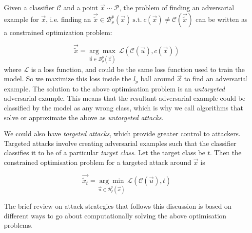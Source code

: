 \documentclass{ociamthesis}
\begin{document}
Given a classifier $\mathcal{C}$ and a point $\vec{x} \sim \mathcal{P}$, the
problem of finding an adversarial example for $\vec{x}$, i.e. finding an
$\vec{\tilde{x}} \in \mathcal{B}_\rho^p(\vec{x})~\text{s.t.}~c(\vec{x}) \neq
\mathcal{C}(\vec{\tilde{x}})$ can be written as a constrained optimization
problem:

\begin{equation*}
    \vec{\tilde{x}} = \underset{\vec{u} \in \mathcal{B}_\rho^p(\vec{x})}
    {\arg\max}~\mathcal{L}(\mathcal{C}(\vec{u}), c(\vec{x}))
\end{equation*}
where $\mathcal{L}$ is a loss function, and could be the same loss function used
to train the model. So we maximize this loss inside the $l_p$ ball around
$\vec{x}$ to find an adversarial example. The solution to the above optimisation
problem is an \emph{untargeted} adversarial example. This means that the
resultant adversarial example could be classified by the model as any wrong
class, which is why we call algorithms that solve or approximate the above as
\emph{untargeted attacks}.

We could also have \emph{targeted attacks}, which provide greater control to
attackers. Targeted attacks involve creating adversarial examples such that the
classifier classifies it to be of a particular \emph{target class}. Let the
target class be $t$. Then the constrained optimisation problem for a targeted
attack around $\vec{x}$ is

\begin{equation*}
    \vec{\tilde{x}_t} = \underset{\vec{u} \in \mathcal{B}_\rho^p(\vec{x})}
    {\arg\min}~\mathcal{L}(\mathcal{C}(\vec{u}), t)
\end{equation*}


The brief review on attack strategies that follows this discussion is based on
different ways to go about computationally solving the above optimisation
problems.
\end{document}
